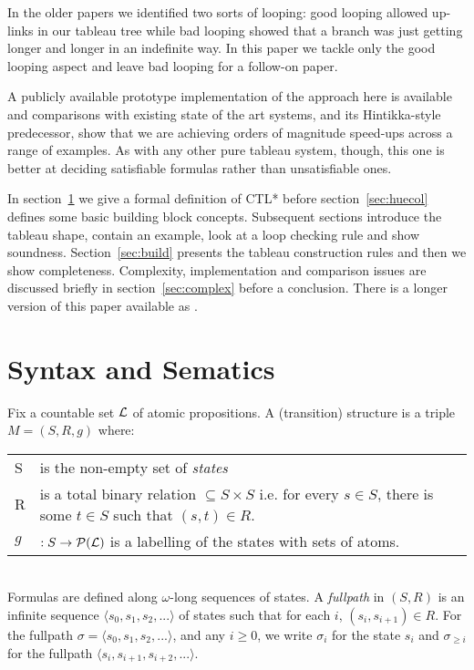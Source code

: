 \documentclass[submission,copyright,creativecommons]{eptcs}
\newcommand{\mnp}{
}
\newcommand{\power}[1]{{\mathcal{P}}( #1 )}
\begin{document}
In the older papers
we identified two sorts of looping:
good looping allowed up-links in our tableau tree
while
bad looping 
showed that a branch was just getting longer and
longer in an indefinite way.
In this paper we
tackle only the good looping aspect
and 
leave bad looping for a follow-on paper.

A publicly available prototype implementation of the
approach here is available
and 
comparisons 
with existing state of the art systems,
and its Hintikka-style predecessor,
show that
we are achieving orders of magnitude
speed-ups across
a range of examples.
As with any other pure tableau system, though,
this one is better at deciding satisfiable formulas
rather than unsatisfiable ones.

In section~\ref{sec:synsem} we give
a formal definition of CTL*
before section~\ref{sec:huecol} defines some basic building block concepts.
Subsequent sections
introduce the tableau shape,
 contain an example,
look at a loop checking rule and show soundness.
Section~\ref{sec:build} presents the tableau construction rules
and then we show
completeness.
Complexity, implementation and comparison
issues are discussed
briefly in section~\ref{sec:complex}
before a conclusion.
There is a longer version of this paper
available as \cite{Rey:fasttablong}.


\mnp

\section{Syntax and Sematics}
\label{sec:synsem}

Fix a countable set $\cal L$
of atomic propositions.
A (transition)  structure is a triple $M=(S,R,g)$
where:\\
\begin{tabular}{ll}
S & is the non-empty set of {\em states}\\
R & is a total binary relation $\subseteq S \times S$
 i.e. for every $s \in S$, there is some $t \in S$ such that
    $(s,t) \in R$.\\
$g$ & $: S \rightarrow \power{\cal L}$ is a labelling of the
states with sets of atoms.\\
\end{tabular}\\

Formulas are defined along $\omega$-long sequences
of states.
A {\em fullpath} in $(S,R)$ is an infinite sequence
$\langle s_0, s_1, s_2, ... \rangle$ of states such that
for each $i$,  $(s_i, s_{i+1}) \in R$.
For the fullpath
$\sigma = \langle s_0, s_1, s_2, ...\rangle$,
and any $i \geq 0$, we write
$\sigma_i$ for the state $s_i$ and
$\sigma_{\geq i}$ for the fullpath
$\langle s_i, s_{i+1}, s_{i+2}, ... \rangle$.
\end{document}
